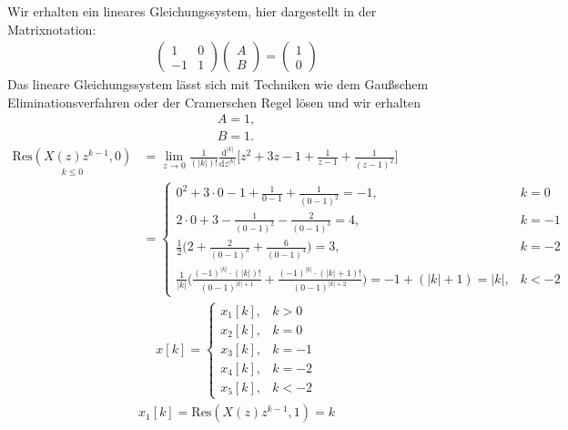 \documentclass[11pt,a4paper,DIV=12]{scrartcl}
\begin{document}
Wir erhalten ein lineares Gleichungssystem, hier dargestellt in der Matrixnotation:
\begin{align}
	\begin{pmatrix}
		1 & 0 \\
		-1 & 1
	\end{pmatrix}
	\begin{pmatrix}
		A \\
		B
	\end{pmatrix}
	=
	\begin{pmatrix}
		1 \\
		0
	\end{pmatrix}
\end{align}
Das lineare Gleichungssystem lässt sich mit Techniken wie dem Gaußschem Eliminationsverfahren oder der Cramerschen Regel lösen und wir erhalten
\begin{align}
	A = 1, \nonumber \\
	B = 1.
\end{align}
\begin{align}
	\underset{k\leq0}{\mathrm{Res}(X(z)z^{k-1},0)}&=\lim\limits_{z\rightarrow0}\frac{1}{(|k|)!}\frac{\mathrm{d}^{|k|}}{\mathrm{d}z^{|k|}}\Bigg[z^2+3z-1+\frac{1}{z-1}+\frac{1}{(z-1)^2}\Bigg]\nonumber\\
	&=\begin{cases}
		0^2+3\cdot0-1+\frac{1}{0-1}+\frac{1}{(0-1)^2}=-1, &k=0 \\
		2\cdot0+3-\frac{1}{(0-1)^2}-\frac{2}{(0-1)^3}=4,&k=-1 \\
		\frac{1}{2}\bigg(2+\frac{2}{(0-1)^3}+\frac{6}{(0-1)^4}\bigg)=3,&k=-2\\
		\frac{1}{|k|}\bigg(\frac{(-1)^{|k|}\cdot (|k|)!}{(0-1)^{|k|+1}}+\frac{(-1)^{|k|}\cdot(|k|+1)!}{(0-1)^{|k|+2}}\bigg)=-1+(|k|+1)=|k|,&k<-2
	\end{cases}
\end{align}
\begin{align}
	x[k]=\begin{cases}
		x_1[k],&k>0 \\
		x_2[k], &k=0 \\
		x_3[k], &k=-1 \\
		x_4[k], &k=-2 \\
		x_5[k], &k<-2
	\end{cases}
\end{align}
\begin{align}
	x_1[k]=\mathrm{Res}(X(z)z^{k-1},1)=k
\end{align}
\end{document}
